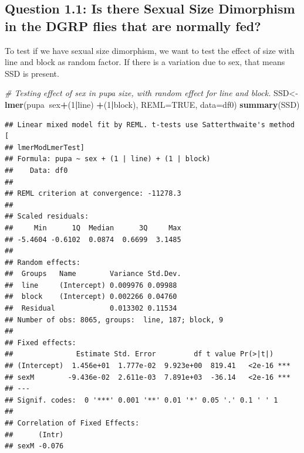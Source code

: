 \documentclass[
]{article}
\newenvironment{Shaded}{\begin{snugshade}}{\end{snugshade}}
\newcommand{\CommentTok}[1]{\textcolor[rgb]{0.56,0.35,0.01}{\textit{#1}}}
\newcommand{\DataTypeTok}[1]{\textcolor[rgb]{0.13,0.29,0.53}{#1}}
\newcommand{\DecValTok}[1]{\textcolor[rgb]{0.00,0.00,0.81}{#1}}
\newcommand{\KeywordTok}[1]{\textcolor[rgb]{0.13,0.29,0.53}{\textbf{#1}}}
\newcommand{\NormalTok}[1]{#1}
\newcommand{\OperatorTok}[1]{\textcolor[rgb]{0.81,0.36,0.00}{\textbf{#1}}}
\newcommand{\OtherTok}[1]{\textcolor[rgb]{0.56,0.35,0.01}{#1}}
\newcommand{\StringTok}[1]{\textcolor[rgb]{0.31,0.60,0.02}{#1}}
\begin{document}
\hypertarget{question-1.1-is-there-sexual-size-dimorphism-in-the-dgrp-flies-that-are-normally-fed}{%
\subsection{Question 1.1: Is there Sexual Size Dimorphism in the DGRP
flies that are normally
fed?}\label{question-1.1-is-there-sexual-size-dimorphism-in-the-dgrp-flies-that-are-normally-fed}}

To test if we have sexual size dimorphism, we want to test the effect of
size with line and block as random factor. If there is a variation due
to sex, that means SSD is present.

\begin{Shaded}
\end{Shaded}

\begin{Shaded}
\begin{Highlighting}[]
\CommentTok{# Testing effect of sex in pupa size, with random effect for line and block.}
\NormalTok{SSD<-}\KeywordTok{lmer}\NormalTok{(pupa}\OperatorTok{~}\NormalTok{sex}\OperatorTok{+}\NormalTok{(}\DecValTok{1}\OperatorTok{|}\NormalTok{line) }\OperatorTok{+}\NormalTok{(}\DecValTok{1}\OperatorTok{|}\NormalTok{block), }\DataTypeTok{REML=}\OtherTok{TRUE}\NormalTok{, }\DataTypeTok{data=}\NormalTok{df0)}
\KeywordTok{summary}\NormalTok{(SSD)}
\end{Highlighting}
\end{Shaded}

\begin{verbatim}
## Linear mixed model fit by REML. t-tests use Satterthwaite's method [
## lmerModLmerTest]
## Formula: pupa ~ sex + (1 | line) + (1 | block)
##    Data: df0
## 
## REML criterion at convergence: -11278.3
## 
## Scaled residuals: 
##     Min      1Q  Median      3Q     Max 
## -5.4604 -0.6102  0.0874  0.6699  3.1485 
## 
## Random effects:
##  Groups   Name        Variance Std.Dev.
##  line     (Intercept) 0.009976 0.09988 
##  block    (Intercept) 0.002266 0.04760 
##  Residual             0.013302 0.11534 
## Number of obs: 8065, groups:  line, 187; block, 9
## 
## Fixed effects:
##               Estimate Std. Error         df t value Pr(>|t|)    
## (Intercept)  1.456e+01  1.777e-02  9.923e+00  819.41   <2e-16 ***
## sexM        -9.436e-02  2.611e-03  7.891e+03  -36.14   <2e-16 ***
## ---
## Signif. codes:  0 '***' 0.001 '**' 0.01 '*' 0.05 '.' 0.1 ' ' 1
## 
## Correlation of Fixed Effects:
##      (Intr)
## sexM -0.076
\end{verbatim}
\end{document}
